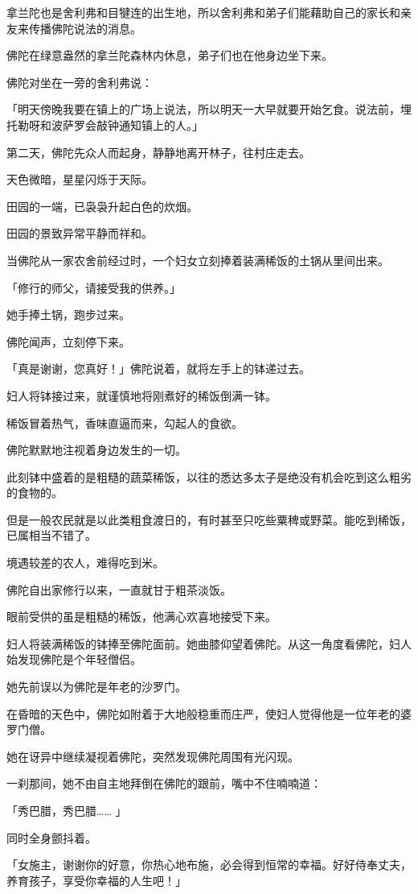 \documentclass[twoside,openany]{book}
\begin{document}
拿兰陀也是舍利弗和目犍连的出生地，所以舍利弗和弟子们能藉助自己的家长和亲友来传播佛陀说法的消息。

佛陀在绿意盎然的拿兰陀森林内休息，弟子们也在他身边坐下来。

佛陀对坐在一旁的舍利弗说：

「明天傍晚我要在镇上的广场上说法，所以明天一大早就要开始乞食。说法前，埋托勒呀和波萨罗会敲钟通知镇上的人。」

第二天，佛陀先众人而起身，静静地离开林子，往村庄走去。

天色微暗，星星闪烁于天际。

田园的一端，已袅袅升起白色的炊烟。

田园的景致异常平静而祥和。

当佛陀从一家农舍前经过时，一个妇女立刻捧着装满稀饭的土锅从里间出来。

「修行的师父，请接受我的供养。」

她手捧土锅，跑步过来。

佛陀闻声，立刻停下来。

「真是谢谢，您真好！」佛陀说着，就将左手上的钵递过去。

妇人将钵接过来，就谨慎地将刚煮好的稀饭倒满一钵。

稀饭冒着热气，香味直逼而来，勾起人的食欲。

佛陀默默地注视着身边发生的一切。

此刻钵中盛着的是粗糙的蔬菜稀饭，以往的悉达多太子是绝没有机会吃到这么粗劣的食物的。

但是一般农民就是以此类粗食渡日的，有时甚至只吃些粟稗或野菜。能吃到稀饭，已属相当不错了。

境遇较差的农人，难得吃到米。

佛陀自出家修行以来，一直就甘于粗茶淡饭。

眼前受供的虽是粗糙的稀饭，他满心欢喜地接受下来。

妇人将装满稀饭的钵捧至佛陀面前。她曲膝仰望着佛陀。从这一角度看佛陀，妇人始发现佛陀是个年轻僧侣。

她先前误以为佛陀是年老的沙罗门。

在昏暗的天色中，佛陀如附着于大地般稳重而庄严，使妇人觉得他是一位年老的婆罗门僧。

她在讶异中继续凝视着佛陀，突然发现佛陀周围有光闪现。

一刹那间，她不由自主地拜倒在佛陀的跟前，嘴中不住喃喃道：

「秀巴腊，秀巴腊……	」

同时全身颤抖着。

「女施主，谢谢你的好意，你热心地布施，必会得到恒常的幸福。好好侍奉丈夫，养育孩子，享受你幸福的人生吧！」
\end{document}
